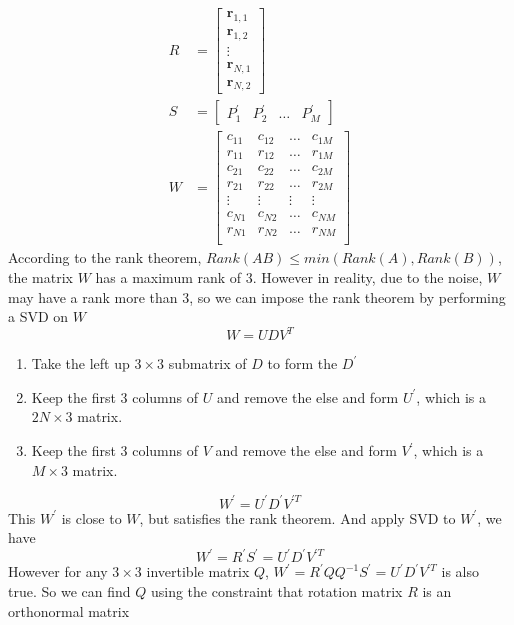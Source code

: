 \documentclass{article}
\begin{document}
\begin{align}
R&=\begin{bmatrix}
\boldsymbol{r}_{1,1}\\\boldsymbol{r}_{1,2}\\\vdots\\\boldsymbol{r}_{N,1}\\\boldsymbol{r}_{N,2}
\end{bmatrix}\\
S&=\begin{bmatrix}P_1^{'}&P_2^{'}&\dots&P_M^{'}\end{bmatrix}\\
W&=\begin{bmatrix}c_{11}&c_{12}&\dots&c_{1M}\\
				  r_{11}&r_{12}&\dots&r_{1M}\\
				  c_{21}&c_{22}&\dots&c_{2M}\\
				  r_{21}&r_{22}&\dots&r_{2M}\\
				  \vdots&\vdots&\vdots&\vdots\\
				  c_{N1}&c_{N2}&\dots&c_{NM}\\
				  r_{N1}&r_{N2}&\dots&r_{NM}\\
\end{bmatrix}
\end{align}
According to the rank theorem, $Rank(AB)\leq min(Rank(A),Rank(B))$, the matrix $W$ has a maximum rank of 3. However in reality, due to the noise, $W$ may have a rank more than 3, so we can impose the rank theorem by performing a SVD on $W$
\begin{equation}
W = UDV^T
\end{equation}
\begin{enumerate}
	\item Take the left up $3\times3$ submatrix of $D$ to form the $D^{'}$
	\item Keep the first 3 columns of $U$ and remove the else and form $U^{'}$, which is a $2N\times 3$ matrix.
	\item Keep the first 3 columns of $V$ and remove the else and form $V^{'}$, which is a $M\times 3$ matrix.
\end{enumerate}
\begin{equation}
W^{'}=U^{'}D^{'}V^{'T}
\end{equation}
This $W^{'}$ is close to $W$, but satisfies the rank theorem. And apply SVD to $W^{'}$, we have
\begin{equation}
W^{'}=R^{'}S^{'}=U^{'}D^{'}V^{'T}
\end{equation}
However for any $3\times3$ invertible matrix $Q$, $W^{'}=R^{'}QQ^{-1}S^{'}=U^{'}D^{'}V^{'T}$ is also true. So we can find $Q$ using the constraint that rotation matrix $R$ is an orthonormal matrix
\end{document}
